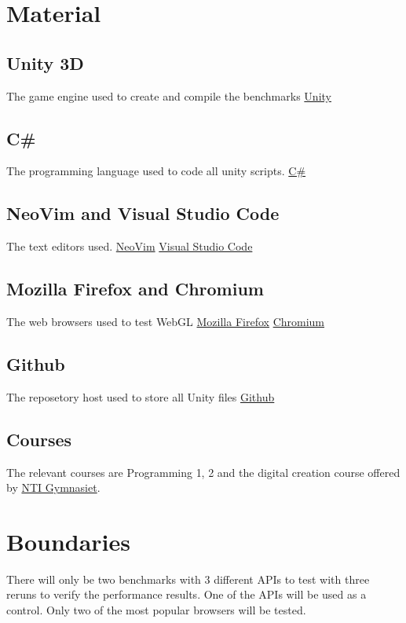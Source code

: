\documentclass{article}
\begin{document}
\section {Material}
\subsection* {Unity 3D}
The game engine used to create and compile the benchmarks
\newline\href{https://unity.com}{Unity}

\subsection* {C\#}
The programming language used to code all unity scripts.
\newline\href{https://docs.microsoft.com/en-us/dotnet/csharp/}{C\#}

\subsection* {NeoVim and Visual Studio Code}
The text editors used.
\newline\href{https://neovim.io/}{NeoVim}
\newline\href{https://code.visualstudio.com/}{Visual Studio Code}

\subsection* {Mozilla Firefox and Chromium}
The web browsers used to test WebGL
\newline\href{https://www.mozilla.org/en-US/firefox/new/}{Mozilla Firefox}
\newline\href{https://code.visualstudio.com/}{Chromium}


\subsection* {Github}
The reposetory host used to store all Unity files
\newline\href{https://github.com}{Github}

\subsection* {Courses}
The relevant courses are Programming 1, 2 and the digital creation course offered by \href{https://www.ntigymnasiet.se/}{NTI Gymnasiet}.


\section {Boundaries}
There will only be two benchmarks with 3 different APIs to test with three reruns to verify the performance results. One of the APIs will be used as a control. Only two of the most popular browsers will be tested.
\end{document}

